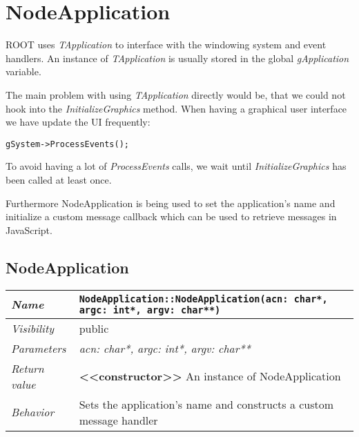 \chapter{NodeApplication}
ROOT uses \textit{TApplication} to interface with the windowing system and event handlers.
An instance of \textit{TApplication} is usually stored in the global \textit{gApplication} variable.

The main problem with using \textit{TApplication} directly would be, that we could not hook into the \textit{InitializeGraphics} method.
When having a graphical user interface we have update the UI frequently:
\begin{verbatim}
gSystem->ProcessEvents();
\end{verbatim}
To avoid having a lot of \textit{ProcessEvents} calls, we wait until \textit{InitializeGraphics} has been called at least once.

Furthermore NodeApplication is being used to set the application's name and initialize a custom message callback which can be used to retrieve messages in JavaScript.

\section{NodeApplication}
\begin{longtable}{p{3cm} @{\hskip 1cm} p{12cm}}
 \hline
\textit{Name} & \texttt{NodeApplication::NodeApplication(acn: char*, argc: int*, argv: char**)}\\
\hline
 \textit{Visibility} & public\\
\hline
\textit{Parameters} & \textit{acn: char*, argc: int*, argv: char**}\\
\hline
\textit{Return value} & \textbf{<<constructor>>} An instance of NodeApplication\\
  \hline
 \textit{Behavior} & Sets the application's name and constructs a custom message handler \\
\hline
\end{longtable} \pagebreak
